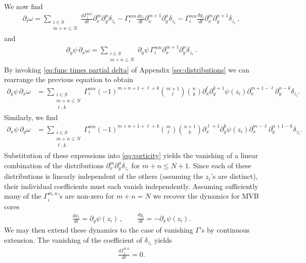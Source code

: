\documentclass[12pt]{amsart}
\theoremstyle{remark}
\begin{document}
We now find
\begin{align*}
  \partial_t \omega =	
  \sum_{
  	\substack{
		i \in S \\
		m+n \leq N}}
  	\frac{d \Gamma_i^{mn}}{dt} \partial_x^m \partial_y^n \delta_{z_i} - \Gamma_i^{mn} \frac{dx_i}{dt} \partial_{x}^{m+1} \partial_y^{n} \delta_{z_i}
	- \Gamma_i^{mn} \frac{dy_i}{dt} \partial_{x}^{m} \partial_y^{n+1} \delta_{z_i}\,,
\end{align*}
and
\begin{align*}
  \partial_y \psi \, \partial_x \omega = 
  \sum_{
  	\substack{
		i \in S \\
		m+n \leq N}}
   \partial_y \psi \, \Gamma_i ^{mn}\partial_x^{m+1} \partial_y^n \delta_{z_i}\,.
\end{align*}
By invoking \eqref{eq:func times partial delta} of Appendix
\ref{sec:distributions} we can rearrange the previous equation to
obtain
\begin{align*}
  \partial_y \psi \, \partial_x \omega &=
  \sum_{
  	\substack{
		i \in S \\
		m+n \leq N \\
		\ell,k}}
	\Gamma_i^{mn} (-1)^{m+n+1 + \ell + k} \binom{m+1}{\ell} \binom{n}{k} \partial_x^{\ell} \partial_y^{k+1} \psi(z_i) \partial_x^{m+1-\ell} \partial_y^{n-k} \delta_{z_i}.
\end{align*}
Similarly, we find
\begin{align*}
  \partial_x \psi \, \partial_y \omega &=
  \sum_{
  	\substack{
		i \in S \\
		m+n \leq N\\
		\ell,k}
	}
	\Gamma_i^{mn} (-1)^{m+n+1 + \ell + k} \binom{m}{\ell} \binom{n+1}{k} \partial_x^{\ell+1} \partial_y^k \psi(z_i) \partial_x^{m-\ell} \partial_y^{n+1-k} \delta_{z_i}.
\end{align*}
Substitution of these expressions into \eqref{eq:vorticity} yields
the vanishing of a linear combination of the distributions
$\partial_x^m \partial_y^n \delta_{z_i}$
for $m+n \leq N+1$.
Since each of these distributions is linearly independent
of the others (assuming the $z_i$'s are distinct),
their individual coefficients must each vanish independently.
Assuming sufficiently many of the $\Gamma_i^{m,n}$'s are non-zero 
for $m+n = N$ we recover the dynamics for MVB cores
\begin{align*}
  \frac{dx_i}{dt} = \partial_y \psi (z_i) \,,\quad  \quad \frac{dy_i}{dt} = - \partial_x \psi(z_i).
\end{align*}
We may then extend these dynamics to the case of vanishing $\Gamma$'s by continuous extension.
The vanishing of the coefficient of $\delta_{z_i}$ yields
\begin{align*}
	\frac{d\Gamma^{0,0}_i}{dt}  = 0.
\end{align*}
\end{document}
